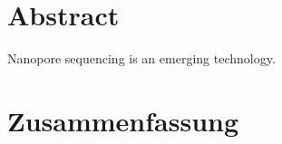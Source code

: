 \chapter*{Abstract}
\label{sec:abstract}
\vspace*{-10mm}

Nanopore sequencing is an emerging technology.



\cleardoublepage
\chapter*{Zusammenfassung}
\label{sec:zusammenfassung}
\vspace*{-10mm}


